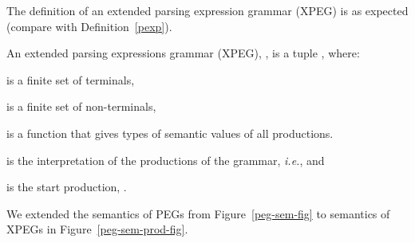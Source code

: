 \documentclass{LMCS}
\newcommand{\defqed}{\hfill\vspace{1ex}}
\newcommand{\ie}{\textit{i.e.}}
\theoremstyle{definition}
\begin{document}
  The definition of an extended parsing expression grammar (XPEG) is 
as expected (compare with Definition~\ref{pexp}).

\begin{defi}\label{pegs-prod-peg}
  An extended parsing expressions grammar (XPEG), , is a tuple
 , where:
\begin{iteMize}{}
  \item  is a finite set of terminals,
  \item  is a finite set of non-terminals,
  \item  is a function that gives types of semantic 
    values of all productions.
  \item  is the interpretation of the productions of the grammar, \ie,
     and
  \item  is the start production, . \defqed
\end{iteMize}
\end{defi}

  We extended the semantics of PEGs from Figure~\ref{peg-sem-fig} to semantics
of XPEGs in Figure~\ref{peg-sem-prod-fig}.
 
\newcommand{\rsucc}[1]{#1_{\surd}}
\newcommand{\rfail}[1]{#1_{\bot}}
\newcommand{\repS}{\rsucc{rep}}
\newcommand{\repF}{\rfail{rep}}
\end{document}
